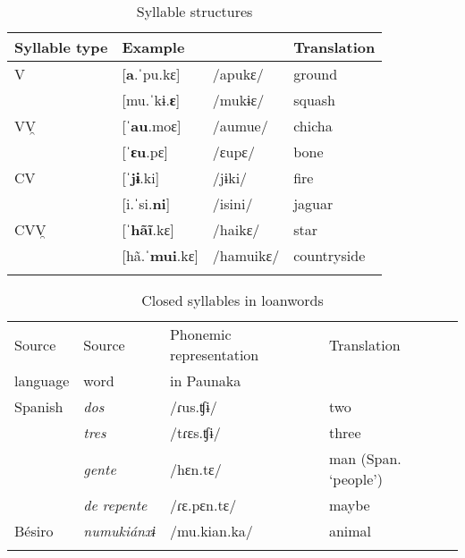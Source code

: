 \begin{table}
\caption{Syllable structures}

\begin{tabular}{llll}
\lsptoprule Syllable type & Example &  & Translation\\
\midrule V & [\textbf{a}.ˈpu.kɛ] & /apukɛ/ & ground \\
& [mu.ˈkɨ.\textbf{ɛ}] & /mukɨɛ/ & squash \\
 VV̯ & [ˈ\textbf{au}.moɛ] & /aumue/ & chicha \\
& [ˈ\textbf{ɛu}.pɛ] & /ɛupɛ/ & bone \\
 CV & [ˈ\textbf{jɨ}.ki] & /jɨki/ & fire\\
& [i.ˈsi.\textbf{ni}] & /isini/ & jaguar \\
 CVV̯ & [ˈ\textbf{hãĩ}.kɛ] & /haikɛ/ & star \\
& [hã.ˈ\textbf{mui}.kɛ] & /hamuikɛ/ & countryside \\
\lspbottomrule
\end{tabular}

\label{table:SyllableStructure}
\end{table}%


\begin{table}
\caption{Closed syllables in loanwords}

\begin{tabularx}{\textwidth}{llQl}
\lsptoprule 
Source & Source & Phonemic representation & Translation\\
language & word &  in Paunaka & \\
\midrule
Spanish & \textit{dos} & /ɾus.ʧɨ/  & two\\
& \textit{tres} & /tɾɛs.ʧɨ/ & three\\
& \textit{gente} & /hɛn.tɛ/ & man (Span. ‘people’)\\
& \textit{de repente} & /ɾɛ.pɛn.tɛ/ & maybe\\
Bésiro & \textit{numukiánxɨ} & /mu.kian.ka/ & animal\\
\lspbottomrule
\end{tabularx}

\label{table:SyllableStructureLoans}
\end{table}

